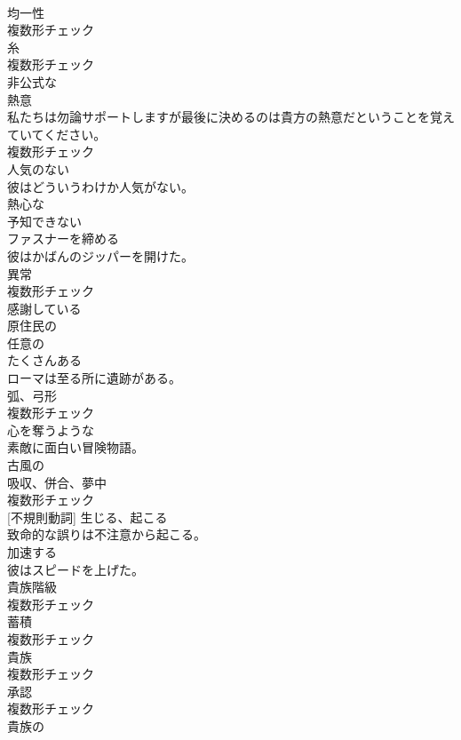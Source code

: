 \documentclass[8pt]{extreport}
\begin{document}
\begin{CJK}{UTF8}{min}
\\	[名詞]	均一性	
\\	複数形チェック
\\	[名詞]	糸	
\\	複数形チェック
\\	[形容詞]	非公式な	
\\	[名詞]	熱意	
\\	私たちは勿論サポートしますが最後に決めるのは貴方の熱意だということを覚えていてください。	
\\	複数形チェック
\\	[形容詞]	人気のない	
\\	彼はどういうわけか人気がない。	
\\	[形容詞]	熱心な	
\\	[形容詞]	予知できない	
\\	[動詞]	ファスナーを締める	
\\	彼はかばんのジッパーを開けた。	
\\	[名詞]	異常	
\\	複数形チェック
\\	[形容詞]	感謝している	
\\	[形容詞]	原住⺠の	
\\	[形容詞]	任意の	
\\	[動詞]	たくさんある	
\\	ローマは至る所に遺跡がある。	
\\	[名詞]	弧、弓形	
\\	複数形チェック
\\	[形容詞]	心を奪うような	
\\	素敵に面白い冒険物語。	
\\	[形容詞]	古風の	
\\	[名詞]	吸収、併合、夢中	
\\	複数形チェック
\\	[動詞] [不規則動詞]	生じる、起こる	
\\	致命的な誤りは不注意から起こる。	
\\	[動詞]	加速する	
\\	彼はスピードを上げた。	
\\	[名詞]	貴族階級	
\\	複数形チェック
\\	[名詞]	蓄積	
\\	複数形チェック
\\	[名詞]	貴族	
\\	複数形チェック
\\	[名詞]	承認	
\\	複数形チェック
\\	[形容詞]	貴族の	

\end{CJK}
\end{document}
